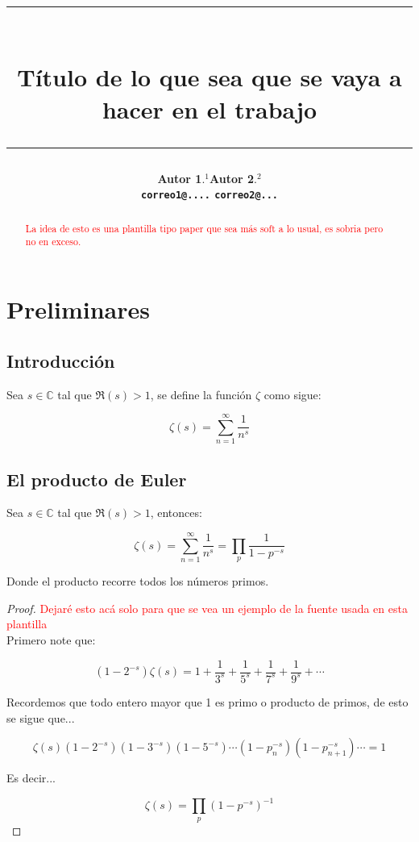 \documentclass[12pt]{article}
\title{\vspace{-2cm}\par\noindent\rule{16cm}{1pt}\large
\\\bfseries Título de lo que sea que se vaya a hacer en el trabajo
\vspace{-0.34cm}\par\noindent\hspace{0.15cm}\rule{16cm}{1pt}
\vspace{-0.6cm}
}
\author{\small \bfseries Autor 1$.^1$\quad \quad \quad \quad \quad \quad \quad \quad\quad\small Autor 2$.^{2}$\\ \small \texttt{correo1@....} \quad \quad \quad \quad  \quad \quad \quad \quad \quad \texttt{correo2@...}
}
\begin{document}
\maketitle
\begin{abstract}
\textcolor{red}{La idea de esto es una plantilla tipo paper que sea más soft a lo usual, es sobria pero no en exceso.}\lipsum[1]
\end{abstract}



\section{Preliminares}

\subsection{Introducción}
\lipsum[2]
\begin{definition}
Sea $s \in \mathbb{C}$ tal que $\Re(s)>1$, se define la función $\zeta$ como sigue:

$$\zeta(s)=\sum_{n=1}^{\infty}\dfrac{1}{n^s}$$
\end{definition}

\begin{note}
   \lipsum[3]
\end{note}

\lipsum[4]

\subsection{El producto de Euler}

\lipsum[3]

\begin{theorem}
    Sea $s\in \mathbb{C}$ tal que $\Re(s)>1$, entonces:

    $$\zeta(s)=\sum_{n=1}^{\infty}\dfrac{1}{n^s}=\prod_p \dfrac{1}{1-p^{-s}}$$

    Donde el producto recorre todos los números primos.
\end{theorem}


\begin{proof}

\textcolor{red}{Dejaré esto acá solo para que se vea un ejemplo de la fuente usada en esta plantilla}\\

    Primero note que:

    $$(1-2^{-s})\zeta(s)=1+\dfrac{1}{3^s}+\dfrac{1}{5^s}+\dfrac{1}{7^s}+\dfrac{1}{9^s}+\cdots$$

    Recordemos que todo entero mayor que 1 es primo o producto de primos, de esto se sigue que...

    $$\zeta(s)\left(1-2^{-s}\right)(1-3^{-s})(1-5^{-s})\cdots(1-p_n^{-s})(1-p_{n+1}^{-s})\cdots=1$$

    Es decir...

    $$\zeta(s)=\prod_p (1-p^{-s})^{-1}$$
\end{proof}
\end{document}
